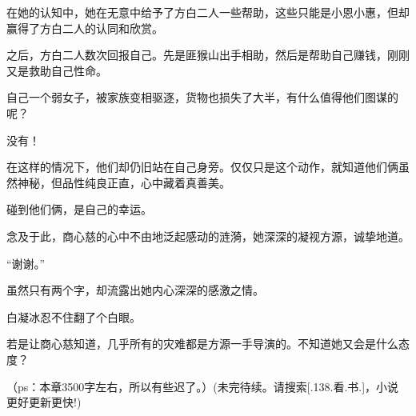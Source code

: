 \begin{this_body}
在她的认知中，她在无意中给予了方白二人一些帮助，这些只能是小恩小惠，但却赢得了方白二人的认同和欣赏。

之后，方白二人数次回报自己。先是匪猴山出手相助，然后是帮助自己赚钱，刚刚又是救助自己性命。

自己一个弱女子，被家族变相驱逐，货物也损失了大半，有什么值得他们图谋的呢？

没有！

在这样的情况下，他们却仍旧站在自己身旁。仅仅只是这个动作，就知道他们俩虽然神秘，但品性纯良正直，心中藏着真善美。

碰到他们俩，是自己的幸运。

念及于此，商心慈的心中不由地泛起感动的涟漪，她深深的凝视方源，诚挚地道。

“谢谢。”

虽然只有两个字，却流露出她内心深深的感激之情。

白凝冰忍不住翻了个白眼。

若是让商心慈知道，几乎所有的灾难都是方源一手导演的。不知道她又会是什么态度？

（ps：本章3500字左右，所以有些迟了。）(未完待续。请搜索[.138.看.书.]，小说更好更新更快!)

\end{this_body}

